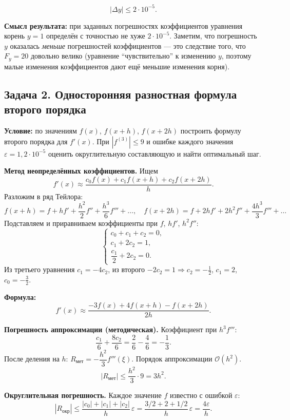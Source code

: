 \documentclass{article}
\begin{document}
$$
\boxed{|\Delta y| \le 2\cdot 10^{-5}.}
$$

\textbf{Смысл результата:} при заданных погрешностях коэффициентов уравнения корень $y=1$ определён с точностью не хуже $2\cdot 10^{-5}$. Заметим, что погрешность $y$ оказалась \textit{меньше} погрешностей коэффициентов --- это следствие того, что $F_y = 20$ довольно велико (уравнение ``чувствительно'' к изменению $y$, поэтому малые изменения коэффициентов дают ещё меньшие изменения корня).




\subsection*{Задача 2. Односторонняя разностная формула второго порядка}
\textbf{Условие:} по значениям $f(x)$, $f(x+h)$, $f(x+2h)$ построить формулу второго порядка для $f'(x)$. При $|f^{(3)}|\le 9$ и ошибке каждого значения $\varepsilon = 1{,}2\cdot 10^{-5}$ оценить округлительную составляющую и найти оптимальный шаг.

\textbf{Метод неопределённых коэффициентов.} Ищем
$$f'(x) \approx \frac{c_0 f(x) + c_1 f(x+h) + c_2 f(x+2h)}{h}.$$
Разложим в ряд Тейлора:
$$f(x+h) = f + hf' + \frac{h^2}{2}f'' + \frac{h^3}{6}f''' + \dots, \quad f(x+2h) = f + 2hf' + 2h^2 f'' + \frac{4h^3}{3}f''' + \dots$$
Подставляем и приравниваем коэффициенты при $f$, $hf'$, $h^2 f''$:
$$
\begin{cases}
c_0 + c_1 + c_2 = 0, \\
c_1 + 2c_2 = 1, \\
\dfrac{c_1}{2} + 2c_2 = 0.
\end{cases}
$$
Из третьего уравнения $c_1 = -4c_2$, из второго $-2c_2 = 1 \Rightarrow c_2 = -\tfrac{1}{2}$, $c_1 = 2$, $c_0 = -\tfrac{3}{2}$.

\textbf{Формула:}
$$\boxed{f'(x) \approx \frac{-3f(x) + 4f(x+h) - f(x+2h)}{2h}}.$$

\textbf{Погрешность аппроксимации (методическая).} Коэффициент при $h^3 f'''$:
$$\frac{c_1}{6} + \frac{8c_2}{6} = \frac{2}{6} - \frac{4}{6} = -\frac{1}{3}.$$
После деления на $h$: $R_{\text{мет}} = -\dfrac{h^2}{3}f'''(\xi)$. Порядок аппроксимации $\mathcal{O}(h^2)$.
$$|R_{\text{мет}}| \le \frac{h^2}{3}\cdot 9 = 3h^2.$$

\textbf{Округлительная погрешность.} Каждое значение $f$ известно с ошибкой $\varepsilon$:
$$|R_{\text{окр}}| \le \frac{|c_0|+|c_1|+|c_2|}{h}\,\varepsilon = \frac{3/2 + 2 + 1/2}{h}\,\varepsilon = \frac{4\varepsilon}{h}.$$
\end{document}
